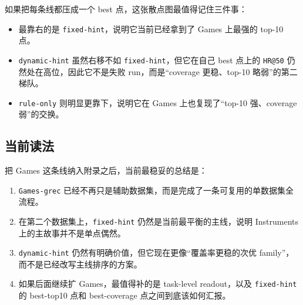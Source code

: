 如果把每条线都压成一个 best 点，这张散点图最值得记住三件事：

\begin{itemize}
\item 最靠右的是 \texttt{fixed-hint}，说明它当前已经拿到了 Games 上最强的 top-10 点。
\item \texttt{dynamic-hint} 虽然右移不如 \texttt{fixed-hint}，但它在自己 best 点上的 \texttt{HR@50} 仍然处在高位，因此它不是失败 run，而是“coverage 更稳、top-10 略弱”的第二梯队。
\item \texttt{rule-only} 则明显更靠下，说明它在 Games 上也复现了“top-10 强、coverage 弱”的交换。
\end{itemize}

\subsection{当前读法}

把 Games 这条线纳入附录之后，当前最稳妥的总结是：

\begin{enumerate}
\item \texttt{Games-grec} 已经不再只是辅助数据集，而是完成了一条可复用的单数据集全流程。
\item 在第二个数据集上，\texttt{fixed-hint} 仍然是当前最平衡的主线，说明 Instruments 上的主故事并不是单点偶然。
\item \texttt{dynamic-hint} 仍然有明确价值，但它现在更像“覆盖率更稳的次优 family”，而不是已经改写主线排序的方案。
\item 如果后面继续扩 Games，最值得补的是 task-level readout，以及 \texttt{fixed-hint} 的 best-top10 点和 best-coverage 点之间到底该如何汇报。
\end{enumerate}

